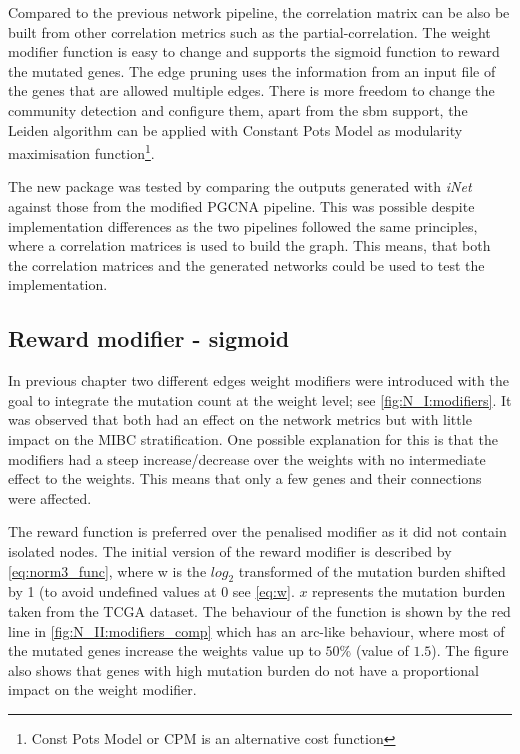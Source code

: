 Compared to the previous network pipeline, the correlation matrix can be also be built from other correlation metrics such as the partial-correlation. The weight modifier function is easy to change and supports the sigmoid function to reward the mutated genes. The edge pruning uses the information from an input file of the genes that are allowed multiple edges. There is more freedom to change the community detection and configure them, apart from the \acrfull{sbm} support, the Leiden algorithm can be applied with Constant Pots Model as modularity maximisation function\footnote{Const Pots Model or CPM is an alternative cost function}.

The new package was tested by comparing the outputs generated with \textit{iNet} against those from the modified PGCNA pipeline. This was possible despite implementation differences as the two pipelines followed the same principles, where a correlation matrices is used to build the graph. This means, that both the correlation matrices and the generated networks could be used to test the implementation.

\subsection*{Reward modifier - sigmoid} \label{s:N_II:reward}

In previous chapter two different edges weight modifiers were introduced with the goal to integrate the mutation count at the weight level; see \cref{fig:N_I:modifiers}. It was observed that both had an effect on the network metrics but with little impact on the MIBC stratification. One possible explanation for this is that the modifiers had a steep increase/decrease over the weights with no intermediate effect to the weights. This means that only a few genes and their connections were affected.

The reward function is preferred over the penalised modifier as it did not contain isolated nodes. The initial version of the reward modifier is described by \cref{eq:norm3_func}, where w is the $log_2$ transformed of the mutation burden shifted by 1 (to avoid undefined values at 0 see \cref{eq:w}. $x$ represents the mutation burden taken from the TCGA dataset.  The behaviour of the function is shown by the red line in \cref{fig:N_II:modifiers_comp} which has an arc-like behaviour, where most of the mutated genes increase the weights value up to $50\%$ (value of $1.5$). The figure also shows that genes with high mutation burden do not have a proportional impact on the weight modifier.

